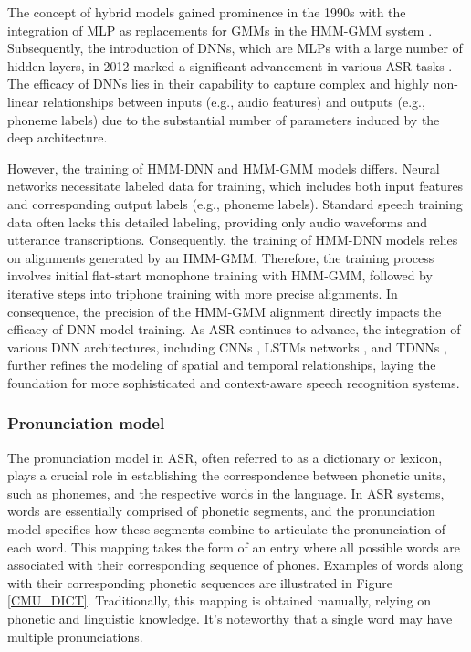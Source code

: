 The concept of hybrid models gained prominence in the 1990s with the integration of \ac{MLP} as replacements for \acp{GMM} in the \ac{HMM-GMM} system \cite{bourlard2012connectionist,meinedo2003audimus}. Subsequently, the introduction of \acp{DNN}, which are \acp{MLP} with a large number of hidden layers, in 2012 marked a significant advancement in various \ac{ASR} tasks \cite{hmm-dnn}. The efficacy of \acp{DNN} lies in their capability to capture complex and highly non-linear relationships between inputs (e.g., audio features) and outputs (e.g., phoneme labels) due to the substantial number of parameters induced by the deep architecture.

However, the training of \ac{HMM-DNN} and \ac{HMM-GMM} models differs. Neural networks necessitate labeled data for training, which includes both input features and corresponding output labels (e.g., phoneme labels). Standard speech training data often lacks this detailed labeling, providing only audio waveforms and utterance transcriptions. Consequently, the training of \ac{HMM-DNN} models relies on alignments generated by an \ac{HMM-GMM}. Therefore, the training process involves initial flat-start monophone training with \ac{HMM-GMM}, followed by iterative steps into triphone training with more precise alignments. In consequence, the precision of the \ac{HMM-GMM} alignment directly impacts the efficacy of \ac{DNN} model training. As \ac{ASR} continues to advance, the integration of various \ac{DNN} architectures, including \acp{CNN} \cite{lang1990time}, \acp{LSTM} networks \cite{sak2014long}, and \acp{TDNN} \cite{waibel2013phoneme}, further refines the modeling of spatial and temporal relationships, laying the foundation for more sophisticated and context-aware speech recognition systems.

\subsubsection{Pronunciation model} %
The pronunciation model in \ac{ASR}, often referred to as a dictionary or lexicon, plays a crucial role in establishing the correspondence between phonetic units, such as phonemes, and the respective words in the language. In \ac{ASR} systems, words are essentially comprised of phonetic segments, and the pronunciation model specifies how these segments combine to articulate the pronunciation of each word. This mapping takes the form of an entry where all possible words are associated with their corresponding sequence of phones. Examples of words along with their corresponding phonetic sequences are illustrated in Figure \ref{CMU_DICT}. Traditionally, this mapping is obtained manually, relying on phonetic and linguistic knowledge. It's noteworthy that a single word may have multiple pronunciations.


